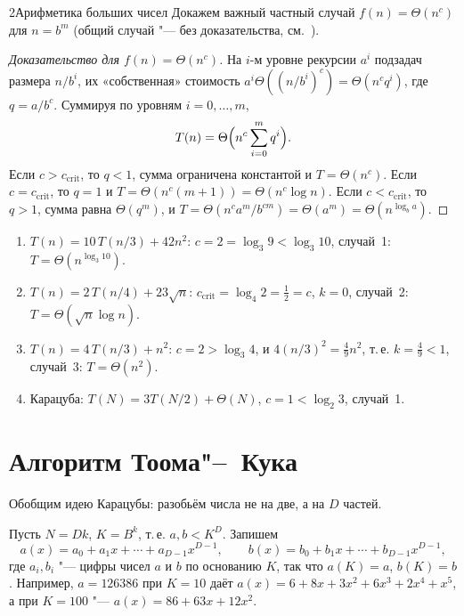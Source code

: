 \begin{lecture}{2}{Арифметика больших чисел}
Докажем важный частный случай $f(n) = \Theta(n^c)$ для $n = b^m$ (общий случай "--- без
доказательства, см.~\cite[гл.~4]{clrs}).

\begin{proof}[Доказательство для $f(n) = \Theta(n^c)$]
На $i$-м уровне рекурсии $a^i$ подзадач размера $n/b^i$, их «собственная» стоимость
$a^i \Theta((n/b^i)^c) = \Theta(n^c q^i)$, где $q = a/b^c$. Суммируя по уровням $i = 0, \dots, m$,
\[
  T(n) = \Theta\Bigl(n^c \sum_{i=0}^{m} q^i\Bigr).
\]
Если $c > c_{\mathrm{crit}}$, то $q < 1$, сумма ограничена константой и $T = \Theta(n^c)$.
Если $c = c_{\mathrm{crit}}$, то $q = 1$ и $T = \Theta(n^c (m + 1)) = \Theta(n^c \log n)$.
Если $c < c_{\mathrm{crit}}$, то $q > 1$, сумма равна $\Theta(q^m)$, и
$T = \Theta(n^c a^m / b^{cm}) = \Theta(a^m) = \Theta(n^{\log_b a})$.
\end{proof}

\begin{example}
\begin{enumerate}
  \item $T(n) = 10\,T(n/3) + 42n^2$: $c = 2 = \log_3 9 < \log_3 10$, случай~1:
    $T = \Theta(n^{\log_3 10})$.
  \item $T(n) = 2\,T(n/4) + 23\sqrt n$: $c_{\mathrm{crit}} = \log_4 2 = \frac12 = c$, $k = 0$,
    случай~2: $T = \Theta(\sqrt n \log n)$.
  \item $T(n) = 4\,T(n/3) + n^2$: $c = 2 > \log_3 4$, и $4 (n/3)^2 = \frac49 n^2$, т.\,е.
    $k = \frac49 < 1$, случай~3: $T = \Theta(n^2)$.
  \item Карацуба: $T(N) = 3T(N/2) + \Theta(N)$, $c = 1 < \log_2 3$, случай~1.
\end{enumerate}
\end{example}


\section{Алгоритм Тоома"--~Кука}

Обобщим идею Карацубы: разобьём числа не на две, а на $D$ частей.

Пусть $N = Dk$, $K = B^k$, т.\,е. $a, b < K^D$. Запишем
\[
  a(x) = a_0 + a_1 x + \cdots + a_{D-1} x^{D-1}, \qquad
  b(x) = b_0 + b_1 x + \cdots + b_{D-1} x^{D-1},
\]
где $a_i, b_i$ "--- цифры чисел $a$ и $b$ по основанию $K$, так что $a(K) = a$, $b(K) = b$.
Например, $a = 126386$ при $K = 10$ даёт $a(x) = 6 + 8x + 3x^2 + 6x^3 + 2x^4 + x^5$, а при
$K = 100$ "--- $a(x) = 86 + 63x + 12x^2$.


\end{lecture}
